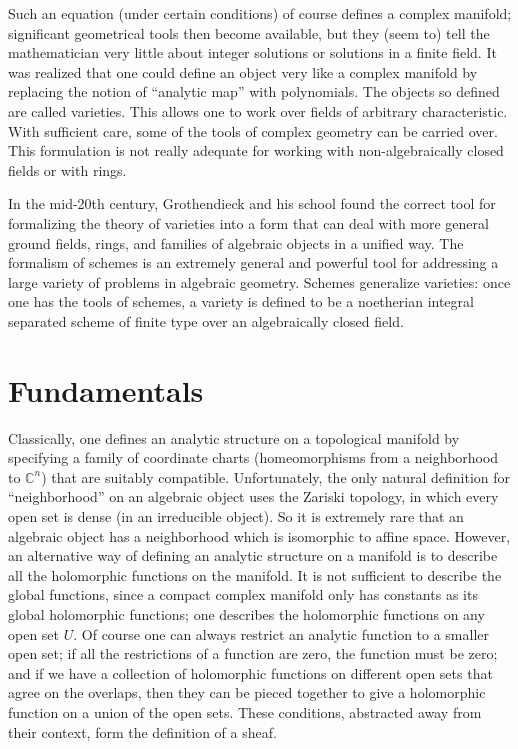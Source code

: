 \documentclass[12pt]{article}
\newcommand{\sect}[1]{\clearpage\section*{#1}}
\begin{document}
Such an equation (under certain conditions) of course defines a complex manifold; significant geometrical tools then become available, but they (seem to) tell the mathematician very little about integer solutions or solutions in a finite field.  It was realized that one could define an object very like a complex manifold by replacing the notion of ``analytic map'' with  polynomials. The objects so defined are called varieties. This allows one to work over fields of arbitrary characteristic. With sufficient care, some of the tools of complex geometry can be carried over. This formulation is not really adequate for working with non-algebraically closed fields or with rings.

In the mid-20th century, Grothendieck and his school found the correct tool for formalizing the theory of varieties into a form that can deal with more general ground fields, rings, and families of algebraic objects in a unified way. The formalism of schemes is an extremely general and powerful tool for addressing a large variety of problems in algebraic geometry.  Schemes generalize varieties: once one has the tools of schemes, a variety is defined to be a noetherian integral separated scheme of finite type over an algebraically closed field.  


\sect{Fundamentals}

Classically, one defines an analytic structure on a topological manifold by specifying a family of coordinate charts (homeomorphisms from a neighborhood to $\mathbb{C}^n$) that are suitably compatible.  Unfortunately, the only natural definition for ``neighborhood'' on an algebraic object uses the Zariski topology, in which every open set is dense (in an irreducible object).  So it is extremely rare that an algebraic object has a neighborhood which is isomorphic to affine space.  However, an alternative way of defining an analytic structure on a manifold is to describe all the holomorphic functions on the manifold.  It is not sufficient to describe the global functions, since a compact complex manifold only has constants as its global holomorphic functions; one describes the holomorphic functions on any open set $U$.  Of course one can always restrict an analytic function to a smaller open set; if all the restrictions of a function are zero, the function must be zero; and if we have a collection of holomorphic functions on different open sets that agree on the overlaps, then they can be pieced together to give a holomorphic function on a union of the open sets.  These conditions, abstracted away from their context, form the definition of a sheaf.
\end{document}
